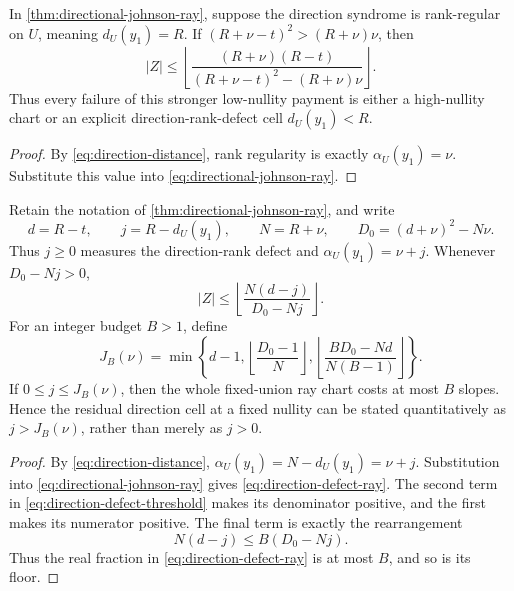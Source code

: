 \documentclass[11pt,a4paper]{amsart}
\numberwithin{equation}{section}
\theoremstyle{remark}
\begin{document}
\begin{corollary}
\label{cor:rank-regular-fixed-union-ray}
In \cref{thm:directional-johnson-ray}, suppose the direction syndrome is
rank-regular on \(U\), meaning \(d_U(y_1)=R\).  If
\((R+\nu-t)^2>(R+\nu)\nu\), then
\begin{equation}
 |Z|\le
 \left\lfloor
 \frac{(R+\nu)(R-t)}
 {(R+\nu-t)^2-(R+\nu)\nu}
 \right\rfloor .                                  \label{eq:rank-regular-fixed-union-ray}
\end{equation}
Thus every failure of this stronger low-nullity payment is either a
high-nullity chart or an explicit direction-rank-defect cell
\(d_U(y_1)<R\).
\end{corollary}

\begin{proof}
By \eqref{eq:direction-distance}, rank regularity is exactly
\(\alpha_U(y_1)=\nu\).  Substitute this value into
\eqref{eq:directional-johnson-ray}.
\end{proof}

\begin{corollary}
\label{cor:quantitative-direction-defect}
Retain the notation of \cref{thm:directional-johnson-ray}, and write
\[
 d=R-t,\qquad
 j=R-d_U(y_1),\qquad
 N=R+\nu,\qquad
 D_0=(d+\nu)^2-N\nu.
\]
Thus \(j\ge0\) measures the direction-rank defect and
\(\alpha_U(y_1)=\nu+j\).  Whenever \(D_0-Nj>0\),
\begin{equation}
 |Z|\le
 \left\lfloor\frac{N(d-j)}{D_0-Nj}\right\rfloor .
 \label{eq:direction-defect-ray}
\end{equation}
For an integer budget \(B>1\), define
\begin{equation}
 J_B(\nu)=\min\left\{
 d-1,
 \left\lfloor\frac{D_0-1}{N}\right\rfloor,
 \left\lfloor\frac{BD_0-Nd}{N(B-1)}\right\rfloor
 \right\}.
 \label{eq:direction-defect-threshold}
\end{equation}
If \(0\le j\le J_B(\nu)\), then the whole fixed-union ray chart costs at
most \(B\) slopes.  Hence the residual direction cell at a fixed nullity
can be stated quantitatively as \(j>J_B(\nu)\), rather than merely as
\(j>0\).
\end{corollary}

\begin{proof}
By \eqref{eq:direction-distance},
\(\alpha_U(y_1)=N-d_U(y_1)=\nu+j\).  Substitution into
\eqref{eq:directional-johnson-ray} gives
\eqref{eq:direction-defect-ray}.  The second term in
\eqref{eq:direction-defect-threshold} makes its denominator positive,
and the first makes its numerator positive.  The final term is exactly the
rearrangement
\[
 N(d-j)\le B(D_0-Nj).
\]
Thus the real fraction in \eqref{eq:direction-defect-ray} is at most
\(B\), and so is its floor.
\end{proof}
\end{document}
